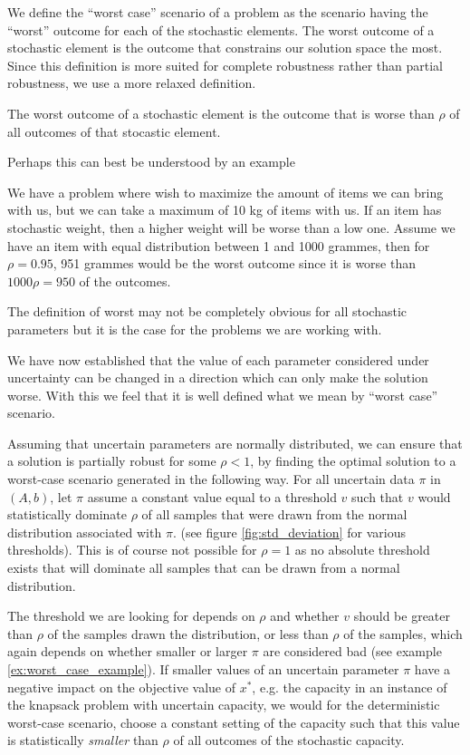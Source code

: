 We define the ``worst case'' scenario of a problem as the scenario
having the ``worst'' outcome for each of the stochastic elements.
The worst outcome of a stochastic element is the outcome that
constrains our solution space the most. Since this definition is more
suited for complete robustness rather than partial robustness, we use
a more relaxed definition.

\begin{definition}
The worst outcome of a stochastic element is the outcome that is worse
than $\rho$ of all outcomes of that stocastic element.
\end{definition}
Perhaps this can best be understood by an example
\begin{example}
We have a problem where wish to maximize the amount of items we can
bring with us, but we can take a maximum of 10 kg of items with us.
If an item has stochastic weight, then a higher weight will be worse
than a low one. Assume we have an item with equal distribution between
1 and 1000 grammes, then for $\rho=0.95$, 951 grammes would be the
worst outcome since it is worse than $1000 \rho = 950$ of the outcomes. 
\end{example}

The definition of worst may not be completely obvious for all
stochastic parameters but it is the case for the problems we are
working with.

We have now established that the value of each parameter considered
under uncertainty can be changed in a direction which can only make
the solution worse. With this we feel that it is well defined what we
mean by ``worst case'' scenario.

Assuming that uncertain parameters are normally distributed, we can
ensure that a solution is partially robust for some $\rho < 1$, by
finding the optimal solution to a worst-case scenario generated in the
following way. For all uncertain data $\pi$ in $(A,b)$, let $\pi$
assume a constant value equal to a threshold $v$ such that $v$ would
statistically dominate $\rho$ of all samples that were drawn from
the normal distribution associated with $\pi$. (see figure
\ref{fig:std_deviation} for various thresholds). This is of course not
possible for $\rho = 1$ as no absolute threshold exists that will
dominate all samples that can be drawn from a normal distribution.

The threshold we are looking for depends on $\rho$ and whether $v$
should be greater than $\rho$ of the samples drawn the distribution,
or less than $\rho$ of the samples, which again depends on whether
smaller or larger $\pi$ are considered bad (see example
\ref{ex:worst_case_example}). If smaller values of an uncertain
parameter $\pi$ have a negative impact on the objective value of
$x^*$, e.g. the capacity in an instance of the knapsack problem with
uncertain capacity, we would for the deterministic worst-case
scenario, choose a constant setting of the capacity such that this
value is statistically \emph{smaller} than $\rho$ of all outcomes of
the stochastic capacity.

